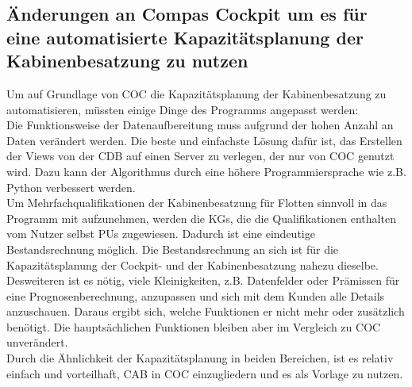 \documentclass [12pt, a4paper, oneside, titlepage, ngerman]{article}
\begin{document}
\subsection{Änderungen an Compas Cockpit um es für eine automatisierte Kapazitätsplanung der Kabinenbesatzung zu nutzen}
Um auf Grundlage von \ac{COC} die Kapazitätsplanung der Kabinenbesatzung zu automatisieren, müssten einige Dinge des Programms angepasst werden: \\
Die Funktionsweise der Datenaufbereitung muss aufgrund der hohen Anzahl an Daten verändert werden. Die beste und einfachste Lösung dafür ist, das Erstellen der Views von der \ac{CDB} auf einen Server zu verlegen, der nur von \ac{COC} genutzt wird. Dazu kann der Algorithmus durch eine höhere Programmiersprache wie z.B. Python verbessert werden. \\
Um Mehrfachqualifikationen der Kabinenbesatzung für Flotten sinnvoll in das Programm mit aufzunehmen, werden die \acp{KG}, die die Qualifikationen enthalten vom Nutzer selbst \acp{PU} zugewiesen. Dadurch ist eine eindeutige Bestandsrechnung möglich. Die Bestandsrechnung an sich ist für die Kapazitätsplanung der Cockpit- und der Kabinenbesatzung nahezu dieselbe. \\
Desweiteren ist es nötig, viele Kleinigkeiten, z.B. Datenfelder oder Prämissen für eine Prognosenberechnung, anzupassen und sich mit dem Kunden alle Details anzuschauen. Daraus ergibt sich, welche Funktionen er nicht mehr oder zusätzlich benötigt. Die hauptsächlichen Funktionen bleiben aber im Vergleich zu \ac{COC} unverändert. \\
Durch die Ähnlichkeit der Kapazitätsplanung in beiden Bereichen, ist es relativ einfach und vorteilhaft, \ac{CAB} in \ac{COC} einzugliedern und es als Vorlage zu nutzen. 
\end{document}
